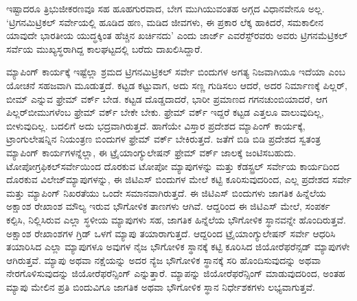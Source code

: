 ಇಷ್ಟಾದರೂ ತ್ರಿಭುಜೀಕರಣವೂ ಸಹ ಹೂಹಗುರವಾದ, ಬೇಗ ಮುಗಿಯುವಂತಹ ಅಗ್ಗದ ವಿಧಾನವೇನೂ ಅಲ್ಲ. ‘ಟ್ರಿಗನಮಿಟ್ರಿಕಲ್​ ಸರ್ವೇಯಲ್ಲಿ ಹೂಡಿದ ಹಣ, ಮಡಿದ ಜೀವಗಳು, ಈ ಪ್ರಕಾರ ಲೆಕ್ಕ ಹಾಕಿದರೆ, ಸಮಕಾಲೀನ ಯಾವುದೇ ಭಾರತೀಯ ಯುದ್ಧಕ್ಕಿಂತ ಹೆಚ್ಚಿನ ಖರ್ಚಿನದು’ ಎಂದು ಜಾರ್ಜ್ ಎವರೆಸ್ಟ್​ರವರು ಅವರು ಟ್ರಿಗನಮೆಟ್ರಿಕಲ್ ಸರ್ವೆಯ ಮುಖ್ಯಸ್ಥರಾಗಿದ್ದ ಕಾಲಘಟ್ಟದಲ್ಲಿ ಬರೆದು ದಾಖಲಿಸಿದ್ದಾರೆ.

ಮ್ಯಾಪಿಂಗ್​ ಕಾರ್ಯಕ್ಕೆ ಇಷ್ಟೆಲ್ಲಾ ಶ್ರಮದ ಟ್ರಿಗನಮಿಟ್ರಿಕಲ್​ ಸರ್ವೇ ಬಿಂದುಗಳ ಅಗತ್ಯ ನಿಜವಾಗಿಯೂ ಇದೆಯಾ ಎಂಬ ಯೋಚನೆ ಸಹಜವಾಗಿ ಮೂಡುತ್ತದೆ. ಕಟ್ಟಡ ಕಟ್ಟುವಾಗ, ಅದು ಸಣ್ಣ ಗುಡಿಸಲು ಆದರೆ, ಅದರ ನಿರ್ಮಾಣಕ್ಕೆ ಪಿಲ್ಲರ್​, ಬೀಮ್ ಎನ್ನುವ ಫ್ರೇಮ್ ವರ್ಕ್ ಬೇಡ. ಕಟ್ಟಡ ದೊಡ್ಡದಾದರೆ, ಭಾರೀ ಪ್ರಮಾಣದ ಗಗನಚುಂಬಿಯಾದರೆ, ಆಗ ಪಿಲ್ಲರ್​ ಬೀಮುಗಳೆಂಬ ಫ್ರೇಮ್ ವರ್ಕ್ ಬೇಕೇ ಬೇಕು. ಫ್ರೇಮ್ ವರ್ಕ್ ಇದ್ದರೆ ಕಟ್ಟಡ ಎತ್ತಲೂ ವಾಲುವುದಿಲ್ಲ, ಬೀಳುವುದಿಲ್ಲ. ಬದಲಿಗೆ ಅದು ಭದ್ರವಾಗಿರುತ್ತದೆ. ಹಾಗೆಯೇ ವಿಸ್ತಾರ ಪ್ರದೇಶದ ಮ್ಯಾಪಿಂಗ್​ ಕಾರ್ಯಕ್ಕೆ, ಟ್ರಾಂಗುಲೇಷನ್ನಿನ ನಿಯಂತ್ರಣ ಬಿಂದುಗಳ ಫ್ರೇಮ್ ವರ್ಕ್ ಬೇಕಿರುತ್ತದೆ. ಜತೆಗೆ ಬಿಡಿ ಬಿಡಿ ಪ್ರದೇಶದ ಸ್ವತಂತ್ರ ಮ್ಯಾಪಿಂಗ್​ ಕಾರ್ಯಗಳನ್ನೆಲ್ಲಾ, ಈ ಟ್ರೈಯಾಂಗ್ಯುಲೇಷನ್​ ಫ್ರೇಮ್ ವರ್ಕ್ ಜಾಲಕ್ಕೆ ಜಂಟಿಸಬಹುದು. ಟೋಪೋಗ್ರಫಿಕಲ್​ ಸರ್ವೇಯಿಂದ ದೊರಕುವ ಟೋಪೋ ಮ್ಯಾಪುಗಳನ್ನು ಮತ್ತು ಕೆಡಸ್ಟ್ರಲ್​ ಸರ್ವೇಯ ಕಾರ್ಯದಿಂದ ದೊರಕುವ ವಿಲೇಜ್​ ಮ್ಯಾಪುಗಳನ್ನು, ಈ ಜಿಟಿಎಸ್​ ಬಿಂದುಗಳ ಮೇಲೆ ಕಟ್ಟಿ ಕೂರಿಸುವುದರಿಂದ, ಎಲ್ಲ ಪ್ರದೇಶದ ಸರ್ವೇ ಮತ್ತು ಮ್ಯಾಪಿಂಗ್​ ನಿಖರತೆಯು ಒಂದೇ ಸಮಾನವಾಗಿರುತ್ತದೆ. ಈ ಜಿಟಿಎಸ್​ ಬಿಂದುಗಳು ಜಾಗತಿಕ ಹಿನ್ನೆಲೆಯ ಅಕ್ಷಾಂಶ ರೇಖಾಂಶ ಮೌಲ್ಯ ಇರುವ ಭೌಗೋಳಿಕ ತಾಣಗಳು ಆಗಿವೆ. ಆದ್ದರಿಂದ ಈ ಜಿಟಿಎಸ್​ ಮೇಲೆ, ಸಂಪರ್ಕ ಕಲ್ಪಿಸಿ, ನಿಲ್ಲಿಸಿರುವ ಎಲ್ಲಾ ಸ್ಥಳೀಯ ಮ್ಯಾಪುಗಳು ಸಹ, ಜಾಗತಿಕ ಹಿನ್ನೆಲೆಯ ಭೌಗೋಳಿಕ ಸ್ಥಾನವನ್ನೇ ಹೊಂದಿರುತ್ತವೆ. ಅಕ್ಷಾಂಶ ರೇಖಾಂಶಗಳ ಗ್ರಿಡ್​ ಒಳಗೆ ಮ್ಯಾಪು ತಯಾರಾಗುತ್ತದೆ. ಆದ್ದರಿಂದ ಟ್ರೈಯಾಂಗ್ಯುಲೇಷನ್​ ಸರ್ವೇ ಆಧರಿಸಿ ತಯಾರಿಸಿದ ಎಲ್ಲಾ ಮ್ಯಾಪುಗಳೂ ಅವುಗಳ ನೈಜ ಭೌಗೋಳಿಕ ಸ್ಥಾನಕ್ಕೆ ಕಟ್ಟಿ ಕೂರಿಸಿದ ಜಿಯೋರೆಫರೆನ್ಸಡ್​ ಮ್ಯಾಪುಗಳೇ ಆಗಿರುತ್ತವೆ. ಮ್ಯಾಪು ಅಥವಾ ನಕ್ಷೆಯನ್ನು ಅದರ ನ್ಯೆಜ ಭೌಗೋಳಿಕ ಸ್ಥಾನಕ್ಕೆ ಸರಿ ಹೊಂದಿಸುವುದನ್ನು ಅಥವಾ ನೇರಗೊಳಿಸುವುದನ್ನು ಜಿಯೋರೆಫರೆನ್ಸಿಂಗ್​ ಎನ್ನುತ್ತಾರೆ. ಮ್ಯಾಪನ್ನು ಜಿಯೋರೆಫರೆನ್ಸಿಂಗ್​ ಮಾಡುವುದರಿಂದ, ಅಂತಹ ಮ್ಯಾಪು ಮೇಲಿನ ಪ್ರತಿ ಬಿಂದುವಿಗೂ ಜಾಗತಿಕ ಅಥವಾ ಭೌಗೋಳಿಕ ಸ್ಥಾನ ನಿರ್ಧೇಶಕಗಳು ಲಭ್ಯವಾಗುತ್ತವೆ.

